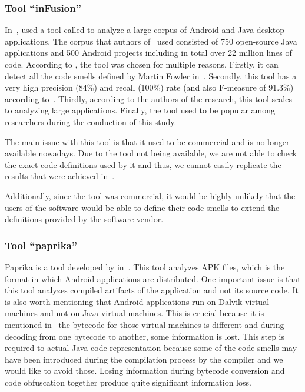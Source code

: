 \subsubsection{Tool ``inFusion''}\label{subsec:toolsay}

In~\cite{mannan2016understanding}, \citeauthor{mannan2016understanding} used a tool called  to analyze a large
corpus of Android and Java desktop applications.
The corpus that authors of~\cite{mannan2016understanding} used consisted of 750 open-source Java applications and 500 Android projects including in total over 22 million lines of code.
According to \citeauthor{mannan2016understanding}, the tool was chosen for multiple reasons.
Firstly, it can detect all the code smells defined by Martin Fowler in~\cite{refactoring-fowler}.
Secondly, this tool has a very high precision (84\%) and recall (100\%) rate (and also F-measure of 91.3\%) according to~\cite{ahmed2015empirical}.
Thirdly, according to the authors of the research, this tool scales to analyzing large applications.
Finally, the tool used to be popular among researchers during the conduction of this study.

The main issue with this tool is that it used to be commercial and is no longer available nowadays.
Due to the tool not being available, we are not able to check the exact code definitions used by it and thus, we cannot
easily replicate the results that were achieved in~\cite{mannan2016understanding}.

Additionally, since the tool was commercial, it would be highly unlikely that the users of the software would
be able to define their code smells to extend the definitions provided by the software vendor.

\subsubsection{Tool ``paprika''}

Paprika is a tool developed by \citeauthor{paprika-paper} in~\cite{paprika-paper}.
This tool analyzes APK files, which is the format in which Android applications are distributed.
One important issue is that this tool analyzes compiled artifacts of the application and not its source code.
It is also worth mentioning that Android applications run on Dalvik virtual machines and not on Java virtual machines.
This is crucial because it is mentioned in~\cite{paprika-paper} the bytecode for those virtual machines is different and during decoding from one bytecode to another, some information is lost.
This step is required to actual Java code representation because some of the code smells
may have been introduced during the compilation process by the compiler and we would like to avoid those.
Losing information during bytecode conversion and code obfuscation together produce quite significant information loss.


